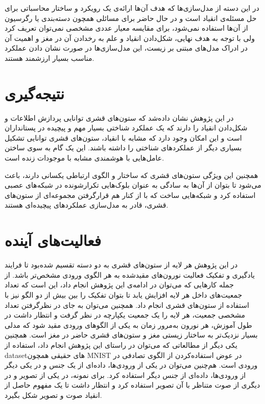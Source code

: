\documentclass[12pt]{report}
\begin{document}
	در این دسته از مدل‌سازی‌ها که هدف آن‌ها ارائه‌ی یک رویکرد و ساختار محاسباتی برای حل مسئله‌ی انقیاد است و در حال حاضر برای مسائلی همچون دسته‌بندی یا رگرسیون از آن‌ها استفاده نمی‌شود، برای مقایسه معیار عددی مشخصی نمی‌توان تعریف کرد ولی با توجه به هدف نهایی، شکل‌دادن انقیاد و علم به رخدادن آن در مغز و اهمیت آن در ادراک مدل‌های مبتنی بر زیست، این مدل‌سازی‌ها در صورت نشان دادن عملکرد مناسب بسیار ارزشمند هستند.
	
	\section{نتیجه‌گیری}
	در این پژوهش نشان داده‌شد که ستون‌های قشری توانایی پردازش اطلاعات و  شکل‌دادن انقیاد را دارند که یک عملکرد شناختی بسیار مهم و پیچیده در پستانداران است و این امکان وجود دارد که مشابه با انقیاد، ستون‌های قشری توانایی تشکیل بسیاری دیگر از عملکرد‌های شناختی را داشته باشند. این یک گام به سوی ساختن عامل‌هایی با هوشمندی مشابه با موجودات زنده است.
	
	همچنین این ویژگی ستون‌های قشری که ساختار و الگوی ارتباطی یکسانی دارند، باعث می‌شود تا بتوان از آن‌ها به سادگی به عنوان بلوک‌هایی تکرار‌شونده در شبکه‌های عصبی استفاده کرد و شبکه‌هایی ساخت که با از کنار هم قرارگرفتن مجموعه‌ای از ستون‌های قشری، قادر به مدل‌سازی عملکرد‌های پیچیده‌ای هستند.
	
	\section{فعالیت‌های آینده}
	در این پژوهش هر لایه از ستون‌های قشری به دو دسته تقسیم شده‌بود تا فرایند یادگیری و تفکیک فعالیت نورون‌های مقید‌شده به هر الگوی ورودی مشخص‌تر باشد. از جمله کار‌هایی که می‌توان در ادامه‌ی این پژوهش انجام داد، این است که تعداد جمعیت‌‌های داخل هر لایه افزایش یابد تا بتوان تفکیک را بین بیش از دو الگو نیز با استفاده از ستون‌های قشری انجام داد. همچنین می‌توان به جای در نظرگرفتن تعداد مشخصی جمعیت، هر لایه را یک جمعیت یکپارچه در نظر گرفت و انتظار داشت در طول آموزش، هر نورون به‌مرور زمان به یکی از الگو‌های ورودی مقید شود که  مدلی بسیار نزدیک‌تر به ساختار زیستی مغز و ستون‌های قشری حاضر در مغز است. همچنین یکی دیگر از مطالعاتی که می‌توان در راستای این پژوهش انجام داد، استفاده از \gls{dataset}‌های حقیقی همچون MNIST
در عوض استفاده‌کردن از الگوی تصادفی در ورودی است. هم‌چنین می‌توان در یکی از ورودی‌ها، داده‌ای از یک جنس و در یکی دیگر از ورودی‌ها، داده‌ای از جنس دیگر استفاده کرد. برای نمونه، در یکی از تصویر و در دیگری از صوت متناظر با آن تصویر استفاده کرد و انتظار داشت تا یک مفهوم حاصل از انقیاد صوت و تصویر شکل بگیرد.
	
\end{document}
